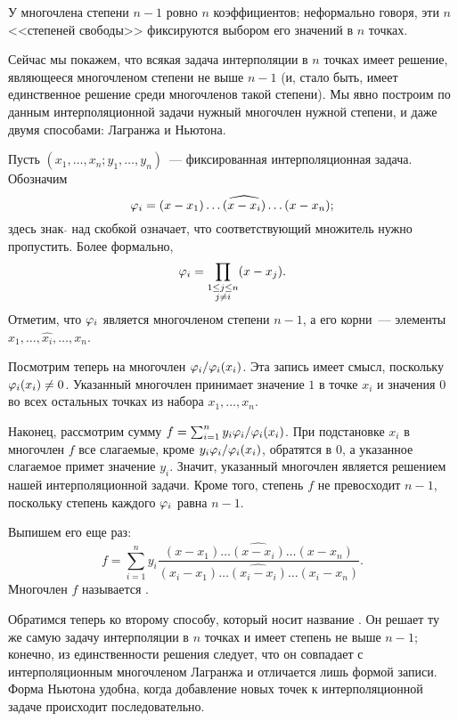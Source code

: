 \begin{remark}
У многочлена степени $n-1$ ровно $n$ коэффициентов; неформально
говоря, эти $n$ <<степеней свободы>> фиксируются выбором его значений
в $n$ точках.
\end{remark}

Сейчас мы покажем, что всякая задача интерполяции в $n$ точках имеет решение,
являющееся многочленом степени не выше $n-1$ (и, стало быть, имеет
единственное решение среди многочленов такой степени). Мы явно
построим по данным интерполяционной задачи нужный многочлен нужной
степени, и даже двумя способами: Лагранжа и Ньютона.

Пусть $(x_1,\dots,x_n;y_1,\dots,y_n)$~--- фиксированная
интерполяционная задача. Обозначим
$$
\varphi_i=(x-x_1)\dots\widehat{(x-x_i)}\dots(x-x_n);
$$
здесь знак $\widehat{}$ над скобкой означает, что соответствующий
множитель нужно пропустить. Более формально,
$$
\varphi_i=\prod_{\substack{1\leq j\leq n\\j\neq i}}(x-x_j).
$$
Отметим, что $\varphi_i$ является многочленом степени $n-1$, а его
корни~--- элементы $x_1,\dots,\widehat{x_i},\dots,x_n$.

Посмотрим теперь на многочлен $\varphi_i/\varphi_i(x_i)$. Эта запись имеет
смысл, поскольку $\varphi_i(x_i)\neq 0$. Указанный многочлен принимает
значение $1$ в точке $x_i$ и значения $0$ во всех остальных точках из
набора $x_1,\dots,x_n$.

Наконец, рассмотрим сумму $f=\sum_{i=1}^n
y_i\varphi_i/\varphi_i(x_i)$. При подстановке $x_i$ в многочлен $f$ все
слагаемые, кроме $y_i\varphi_i/\varphi_i(x_i)$, обратятся в $0$, а указанное
слагаемое примет значение $y_i$. Значит, указанный многочлен является
решением нашей интерполяционной задачи. Кроме того, степень $f$ не
превосходит $n-1$, поскольку степень каждого $\varphi_i$ равна $n-1$.

Выпишем его еще раз:
$$
f=\sum_{i=1}^n y_i\frac{(x-x_1)\dots\widehat{(x-x_i)}\dots(x-x_n)}{(x_i-x_1)\dots
  \widehat{(x_i-x_i)}\dots(x_i-x_n)}.
$$
Многочлен $f$ называется .

Обратимся теперь ко второму способу, который носит название
. Он решает ту же самую
задачу интерполяции в $n$ точках и имеет степень не выше $n-1$;
конечно, из единственности решения следует, что он совпадает с
интерполяционным многочленом Лагранжа и отличается лишь формой
записи. Форма Ньютона удобна, когда добавление новых точек к
интерполяционной задаче происходит последовательно.

